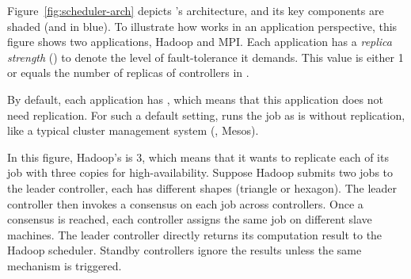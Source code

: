 



Figure~\ref{fig:scheduler-arch} depicts \tripod's architecture, and its key 
components are shaded (and in blue). To illustrate how \tripod works in an 
application perspective, this figure shows two applications, Hadoop and MPI. 
Each application has a \emph{replica strength} () to denote the level of 
fault-tolerance it demands. This value is either 1 or equals the number of 
replicas of controllers in \tripod.

By default, each application has , which means that this application 
does not need replication. For such a default setting, \tripod runs the job as 
is without replication, like a typical cluster management system (\eg, Mesos).

In this figure, Hadoop's  is 3, which means that it wants to replicate 
each of its job with three copies for high-availability. Suppose Hadoop 
submits two jobs to the leader controller, each has different shapes (triangle 
or hexagon). The leader controller then invokes a consensus on each job across 
controllers. Once a consensus is reached, each controller assigns the same job 
on different slave machines. The leader controller directly returns its 
computation result to the Hadoop scheduler. Standby controllers ignore the 
results unless the same mechanism is triggered.

